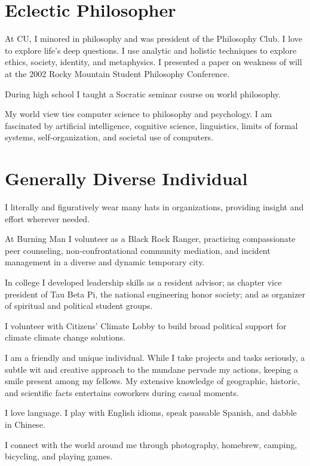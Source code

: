 \section*{Eclectic Philosopher}
  \begin{compactitem}
  \item At CU, I minored in philosophy and was president of the Philosophy Club.
    I love to explore life's deep questions.  I use analytic and holistic
    techniques to explore ethics, society, identity, and metaphysics.
    I presented a paper on weakness of will at the 2002 Rocky Mountain Student
    Philosophy Conference.
  \item During high school I taught a Socratic seminar course on world
    philosophy.
  \item My world view ties computer science to philosophy and psychology.  I am
    fascinated by artificial intelligence, cognitive science, linguistics,
    limits of formal systems, self-organization, and societal use of computers.
  \end{compactitem}
\section*{Generally Diverse Individual}
  \begin{compactitem}
  \item I literally and figuratively wear many hats in organizations,
    providing insight and effort wherever needed.
  \item At Burning Man I volunteer as a Black Rock Ranger, practicing
    compassionate peer counseling, non-confrontational community mediation, and
    incident management in a diverse and dynamic temporary city.
  \item In college I developed leadership skills as a resident advisor; as
    chapter vice president of Tau Beta Pi, the national engineering honor
    society; and as organizer of spiritual and political student groups.
  \item I volunteer with Citizens' Climate Lobby to build broad political
    support for climate climate change solutions.
  \item I am a friendly and unique individual.  While I take projects and tasks
    seriously, a subtle wit and creative approach to the mundane pervade my
    actions, keeping a smile present among my fellows. My extensive knowledge of
    geographic, historic, and scientific facts entertains coworkers during
    casual moments.
  \item I love language.  I play with English idioms, speak passable Spanish,
    and dabble in Chinese.
  \item I connect with the world around me through photography, homebrew,
    camping, bicycling, and playing games.
  \end{compactitem}

